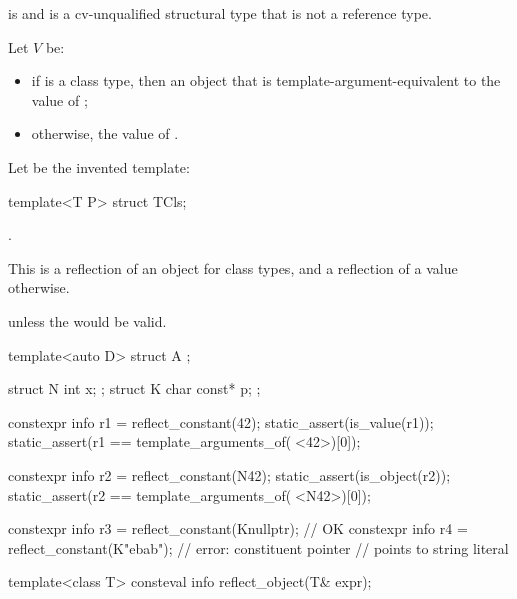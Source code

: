 \begin{itemdescr}
\pnum
\mandates
{} is 
and  is a cv-unqualified structural type
that is not a reference type.

\pnum
Let $V$ be:
\begin{itemize}
\item
  if  is a class type,
  then an object that is template-argument-equivalent to the value of ;
\item
  otherwise, the value of .
\end{itemize}

\pnum
Let  be the invented template:
\begin{codeblock}
template<T P> struct TCls;
\end{codeblock}

\pnum
\returns
{}.
\begin{note}
This is a reflection of an object for class types,
and a reflection of a value otherwise.
\end{note}

\pnum
\throws
{} unless
the   would be valid.

\pnum
\begin{example}
\begin{codeblock}
template<auto D>
  struct A { };

struct N { int x; };
struct K { char const* p; };

constexpr info r1 = reflect_constant(42);
static_assert(is_value(r1));
static_assert(r1 == template_arguments_of(^^A<42>)[0]);

constexpr info r2 = reflect_constant(N{42});
static_assert(is_object(r2));
static_assert(r2 == template_arguments_of(^^A<N{42}>)[0]);

constexpr info r3 = reflect_constant(K{nullptr});   // OK
constexpr info r4 = reflect_constant(K{"ebab"});    // error: constituent pointer
                                                    // points to string literal
\end{codeblock}
\end{example}
\end{itemdescr}

%
\begin{itemdecl}
template<class T>
  consteval info reflect_object(T& expr);
\end{itemdecl}

